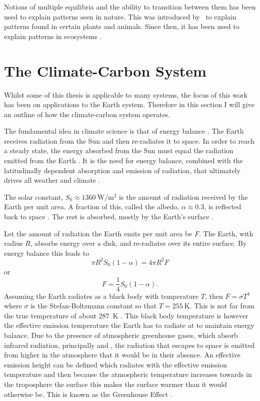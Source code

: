 Notions of multiple equilibria and the ability to transition between them has been used to explain patterns seen in nature. This was introduced by~\cite{Turing1952} to explain
patterns found in certain plants and animals. Since then, it has been used to explain patterns in ecosystems \parencite{Rietkerk2008}.

\section{The Climate-Carbon System}

Whilst some of this thesis is applicable to many systems, the focus of this work has been on applications to the Earth system. Therefore in this section I will give an outline of
how the climate-carbon system operates.

The fundamental idea in climate science is that of energy balance \parencite{North1981}. The Earth receives radiation from the Sun and then re-radiates it to space.
In order to reach a steady state, the energy absorbed from the Sun must equal the radiation emitted from the Earth \parencite{Peixoto1992}. It is the need for energy balance, combined with the
latitudinally dependent absorption and emission of radiation, that ultimately drives all weather and climate \parencite{Lorenz1967}.

The solar constant, $S_0 \approx \SI{1360}{\watt\per\meter\squared}$ \parencite{Johnson1954} is the amount of radiation received by the Earth per unit area.  A fraction of this,
called the albedo, $\alpha \approx 0.3$, is reflected back to space \parencite{Goode2021}. The rest is absorbed, mostly by the Earth's surface \parencite{Trenberth2009}.

Let the amount of radiation the Earth emits per unit area be $F$. The Earth, with radius $R$, absorbs energy over a disk, and re-radiates
over its entire surface. By energy balance this leads to
\begin{equation}
  \pi R^2 S_0 (1-\alpha) = 4 \pi R^2 F
\end{equation}
or
\begin{equation}
  \label{eq:energy_balance}
  F = \frac{1}{4} S_0 \left(1 - \alpha\right).
\end{equation}
Assuming the Earth radiates as a black body with temperature $T$, then $F = \sigma T^4$ where $\sigma$ is the Stefan-Boltzmann constant  so that $T = \SI{255}{\kelvin}$.
This is not far from the true temperature of about \SI{287}{\kelvin} \parencite{Jones1999}.
This black body temperature is however the effective emission temperature the Earth has to radiate at to maintain energy balance. Due to the presence of atmospheric greenhouse gases,
which absorb infrared radiation, principally  and , the radiation that escapes to space is emitted from higher in the atmosphere that it would be in their absence.
An effective emission height can be defined which
radiates with the effective emission temperature and then because the atmospheric temperature increases towards in the troposphere the surface this makes the surface warmer than it would otherwise be.
This is known as the Greenhouse Effect \parencite{Pierrehumbert2010}.

